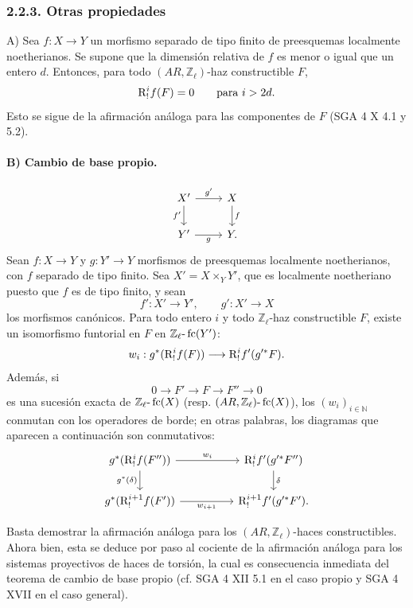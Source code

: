 \subsubsection*{2.2.3. Otras propiedades}

A) Sea \(f:X\to Y\) un morfismo separado de tipo finito de preesquemas localmente noetherianos. Se supone que la dimensión relativa de \(f\) es menor o igual que un entero \(d\). Entonces, para todo \((AR,\mathbb Z_\ell)\)-haz constructible \(F\),
\[
\mathrm{R}^i_!f(F)=0\qquad\text{para }i>2d.
\]
Esto se sigue de la afirmación análoga para las componentes de \(F\) (SGA 4 X 4.1 y 5.2).

\paragraph{B) Cambio de base propio.}
\[
\begin{tikzcd}
X' \arrow[r,"g'"] \arrow[d,"f'"'] & X \arrow[d,"f"]\\
Y' \arrow[r,"g"'] & Y .
\end{tikzcd}
\]
Sean \(f:X\to Y\) y \(g:Y'\to Y\) morfismos de preesquemas localmente noetherianos, con \(f\) separado de tipo finito. Sea \(X'=X\times_Y Y'\), que es localmente noetheriano puesto que \(f\) es de tipo finito, y sean
\[
f':X'\to Y',\qquad g':X'\to X
\]
los morfismos canónicos. Para todo entero \(i\) y todo \(\mathbb Z_\ell\)-haz constructible \(F\), existe un isomorfismo funtorial en \(F\) en \(\mathbb Z_\ell\text{-}\operatorname{fc}(Y')\):
\[
w_i:g^*(\mathrm{R}^i_!f(F))\longrightarrow \mathrm{R}^i_!f'(g'^*F).
\]
Además, si
\[
0\longrightarrow F'\longrightarrow F\longrightarrow F''\longrightarrow 0
\]
es una sucesión exacta de \(\mathbb Z_\ell\text{-}\operatorname{fc}(X)\) (resp. \((AR,\mathbb Z_\ell)\text{-}\operatorname{fc}(X)\)), los \((w_i)_{i\in\mathbb N}\) conmutan con los operadores de borde; en otras palabras, los diagramas que aparecen a continuación son conmutativos:
\[
\begin{tikzcd}[column sep=huge]
g^*(\R^i_!f(F'')) \arrow[r,"w_i"] \arrow[d,"g^*(\delta)"']
&
\R^i_!f'(g'^*F'') \arrow[d,"\delta"]\\
g^*(\R^{i+1}_!f(F')) \arrow[r,"w_{i+1}"']
&
\R^{i+1}_!f'(g'^*F').
\end{tikzcd}
\]

\begin{prooftext}[Demostración]
Basta demostrar la afirmación análoga para los \((AR,\mathbb Z_\ell)\)-haces constructibles. Ahora bien, esta se deduce por paso al cociente de la afirmación análoga para los sistemas proyectivos de haces de torsión, la cual es consecuencia inmediata del teorema de cambio de base propio (cf. SGA 4 XII 5.1 en el caso propio y SGA 4 XVII en el caso general).
\end{prooftext}
